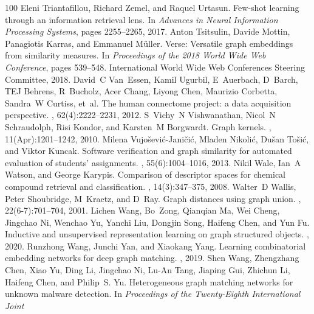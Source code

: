 \begin{thebibliography}{100}
Eleni Triantafillou, Richard Zemel, and Raquel Urtasun.
\newblock Few-shot learning through an information retrieval lens.
\newblock In {\em Advances in Neural Information Processing Systems}, pages
  2255--2265, 2017.
Anton Tsitsulin, Davide Mottin, Panagiotis Karras, and Emmanuel M{\"u}ller.
\newblock Verse: Versatile graph embeddings from similarity measures.
\newblock In {\em Proceedings of the 2018 World Wide Web Conference}, pages
  539--548. International World Wide Web Conferences Steering Committee, 2018.
David~C Van~Essen, Kamil Ugurbil, E~Auerbach, D~Barch, TEJ Behrens, R~Bucholz,
  Acer Chang, Liyong Chen, Maurizio Corbetta, Sandra~W Curtiss, et~al.
\newblock The human connectome project: a data acquisition perspective.
, 62(4):2222--2231, 2012.
S~Vichy~N Vishwanathan, Nicol~N Schraudolph, Risi Kondor, and Karsten~M
  Borgwardt.
\newblock Graph kernels.
, 11(Apr):1201--1242, 2010.
Milena Vujo{\v{s}}evi{\'c}-Jani{\v{c}}i{\'c}, Mladen Nikoli{\'c}, Du{\v{s}}an
  To{\v{s}}i{\'c}, and Viktor Kuncak.
\newblock Software verification and graph similarity for automated evaluation
  of students’ assignments.
, 55(6):1004--1016, 2013.
Nikil Wale, Ian~A Watson, and George Karypis.
\newblock Comparison of descriptor spaces for chemical compound retrieval and
  classification.
, 14(3):347--375, 2008.
Walter~D Wallis, Peter Shoubridge, M~Kraetz, and D~Ray.
\newblock Graph distances using graph union.
, 22(6-7):701--704, 2001.
Lichen Wang, Bo~Zong, Qianqian Ma, Wei Cheng, Jingchao Ni, Wenchao Yu, Yanchi
  Liu, Dongjin Song, Haifeng Chen, and Yun Fu.
\newblock Inductive and unsupervised representation learning on graph
  structured objects.
, 2020.
Runzhong Wang, Junchi Yan, and Xiaokang Yang.
\newblock Learning combinatorial embedding networks for deep graph matching.
, 2019.
Shen Wang, Zhengzhang Chen, Xiao Yu, Ding Li, Jingchao Ni, Lu-An Tang, Jiaping
  Gui, Zhichun Li, Haifeng Chen, and Philip~S. Yu.
\newblock Heterogeneous graph matching networks for unknown malware detection.
\newblock In {\em Proceedings of the Twenty-Eighth International Joint
}
\end{thebibliography}
